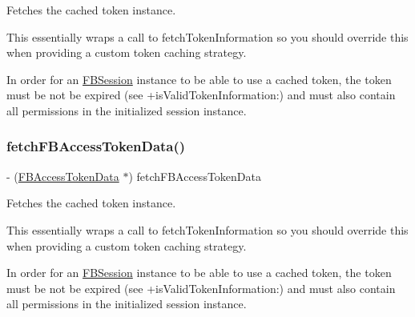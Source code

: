 Fetches the cached token instance.

This essentially wraps a call to {\ttfamily fetch\+Token\+Information} so you should override this when providing a custom token caching strategy.

In order for an {\ttfamily \hyperlink{interfaceFBSession}{F\+B\+Session}} instance to be able to use a cached token, the token must be not be expired (see {\ttfamily +is\+Valid\+Token\+Information\+:}) and must also contain all permissions in the initialized session instance. \mbox{\label{interfaceFBSessionTokenCachingStrategy_a7378a3d9006864d343e086bbfbe66948}} 
\subsubsection{\texorpdfstring{fetch\+F\+B\+Access\+Token\+Data()}{fetchFBAccessTokenData()}\hspace{0.1cm}{\footnotesize\ttfamily [4/5]}}
{\footnotesize\ttfamily -\/ (\hyperlink{interfaceFBAccessTokenData}{F\+B\+Access\+Token\+Data} $\ast$) fetch\+F\+B\+Access\+Token\+Data \begin{DoxyParamCaption}{ }\end{DoxyParamCaption}}

Fetches the cached token instance.

This essentially wraps a call to {\ttfamily fetch\+Token\+Information} so you should override this when providing a custom token caching strategy.

In order for an {\ttfamily \hyperlink{interfaceFBSession}{F\+B\+Session}} instance to be able to use a cached token, the token must be not be expired (see {\ttfamily +is\+Valid\+Token\+Information\+:}) and must also contain all permissions in the initialized session instance. \mbox{\label{interfaceFBSessionTokenCachingStrategy_a7378a3d9006864d343e086bbfbe66948}} 
